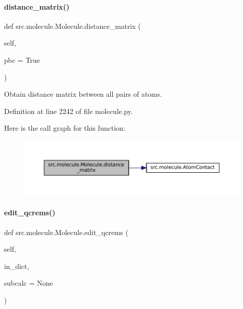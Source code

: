 \paragraph{\texorpdfstring{distance\+\_\+matrix()}{distance\_matrix()}}
{\footnotesize\ttfamily def src.\+molecule.\+Molecule.\+distance\+\_\+matrix (\begin{DoxyParamCaption}\item[{}]{self,  }\item[{}]{pbc = {\ttfamily True} }\end{DoxyParamCaption})}



Obtain distance matrix between all pairs of atoms. 



Definition at line 2242 of file molecule.\+py.

Here is the call graph for this function\+:
\nopagebreak
\begin{figure}[H]
\begin{center}
\leavevmode
\includegraphics[width=350pt]{classsrc_1_1molecule_1_1Molecule_ac9ca356c6a6ea6d5b470d819ab473f84_cgraph}
\end{center}
\end{figure}
\mbox{\label{classsrc_1_1molecule_1_1Molecule_ad47b76d0fe660f2cfafceb67f358a5c2}} 
\paragraph{\texorpdfstring{edit\+\_\+qcrems()}{edit\_qcrems()}}
{\footnotesize\ttfamily def src.\+molecule.\+Molecule.\+edit\+\_\+qcrems (\begin{DoxyParamCaption}\item[{}]{self,  }\item[{}]{in\+\_\+dict,  }\item[{}]{subcalc = {\ttfamily None} }\end{DoxyParamCaption})}



